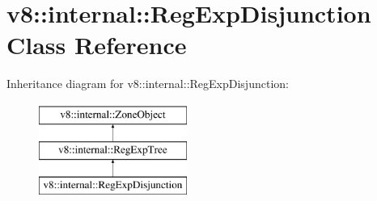 \hypertarget{classv8_1_1internal_1_1RegExpDisjunction}{}\section{v8\+:\+:internal\+:\+:Reg\+Exp\+Disjunction Class Reference}
\label{classv8_1_1internal_1_1RegExpDisjunction}
Inheritance diagram for v8\+:\+:internal\+:\+:Reg\+Exp\+Disjunction\+:\begin{figure}[H]
\begin{center}
\leavevmode
\includegraphics[height=3.000000cm]{classv8_1_1internal_1_1RegExpDisjunction}
\end{center}
\end{figure}
